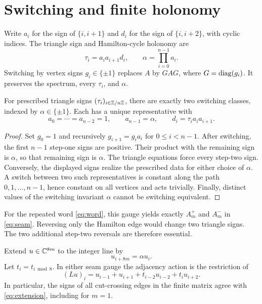 \section{Switching and finite holonomy}

Write $a_i$ for the sign of $\{i,i+1\}$ and $d_i$ for the sign of
$\{i,i+2\}$, with cyclic indices. The triangle sign and Hamilton-cycle
holonomy are
\[
 \tau_i=a_i a_{i+1}d_i,\qquad \alpha=\prod_{i=0}^{n-1}a_i.
\]
Switching by vertex signs $g_i\in\{\pm1\}$ replaces $A$ by $GAG$,
where $G=\operatorname{diag}(g_i)$. It preserves the spectrum, every $\tau_i$, and
$\alpha$.

\begin{lemma}\label{lem:gauge}
For prescribed triangle signs $(\tau_i)_{i\in\mathbb Z/n\mathbb Z}$, there are exactly
two switching classes, indexed by $\alpha\in\{\pm1\}$. Each has a unique
representative with
\[
 a_0=\cdots=a_{n-2}=1,\qquad a_{n-1}=\alpha,
 \qquad d_i=\tau_i a_i a_{i+1}.
\]
\end{lemma}
\begin{proof}
Set $g_0=1$ and recursively $g_{i+1}=g_i a_i$ for $0\le i<n-1$.
After switching, the first $n-1$ step-one signs are positive. Their product
with the remaining sign is $\alpha$, so that remaining sign is $\alpha$.
The triangle equations force every step-two sign. Conversely, the displayed
signs realize the prescribed data for either choice of $\alpha$.
A switch between two such representatives is constant along the path
$0,1,\ldots,n-1$, hence constant on all vertices and acts trivially.
Finally, distinct values of the switching invariant $\alpha$ cannot be
switching equivalent.
\end{proof}

For the repeated word \eqref{eq:word}, this gauge yields exactly $A_m^+$
and $A_m^-$ in \eqref{eq:seam}. Reversing only the Hamilton edge would
change two triangle signs. The two additional step-two reversals are
therefore essential.

Extend $u\in\mathbb C^{8m}$ to the integer line by
\begin{equation}
 u_{i+8m}=\alpha u_i.
 \label{eq:extension}
\end{equation}
Let $t_i=t_{i\bmod8}$. In either seam gauge the adjacency action is the
restriction of
\begin{equation}
 (Lu)_i=u_{i-1}+u_{i+1}+t_{i-2}u_{i-2}+t_i u_{i+2}.
 \label{eq:infinite-action}
\end{equation}
In particular, the signs of all cut-crossing edges in the finite matrix
agree with \eqref{eq:extension}, including for $m=1$.

